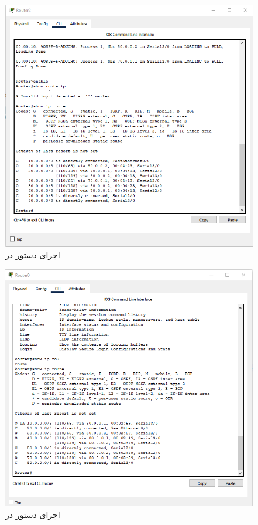 \documentclass[12pt]{article}
\begin{document}
\begin{figure}[H]
	\centering
	\includegraphics[scale=0.4]{images/ospf/13.png}
	\caption{اجرای دستور  در } 
	\label{iprouteospf}
\end{figure}

\begin{figure}[H]
	\centering	\includegraphics[scale=0.4]{images/ospf/12.png}
	\caption{اجرای دستور  در } 
	\label{iprouteospf2}
\end{figure}
\end{document}
